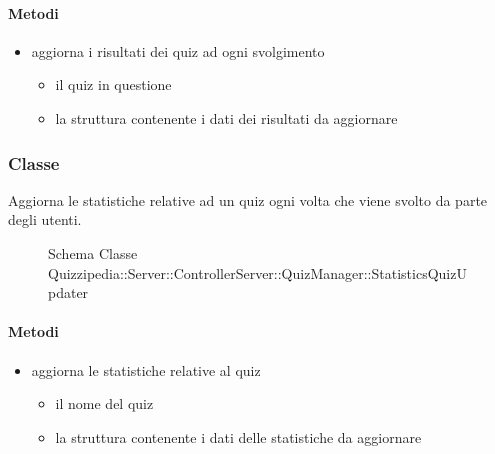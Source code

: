 \paragraph{Metodi}
\begin{itemize}
\item {}
\newline
aggiorna i risultati dei quiz ad ogni svolgimento
\newline
{}
\newline
\begin{itemize}
\item {}
\newline
il quiz in questione
\item {}
\newline
la struttura contenente i dati dei risultati da aggiornare
\end{itemize}
\end{itemize}
\subsubsection{Classe }
Aggiorna le statistiche relative ad un quiz ogni volta che viene svolto da parte degli utenti.
\begin{figure}[H]
\centering
\noindent{}
\caption[Schema Classe StatisticsQuizUpdater]{Schema Classe Quizzipedia::Server::ControllerServer::QuizManager::StatisticsQuizUpdater}
\end{figure}
\paragraph{Metodi}
\begin{itemize}
\item {}
\newline
aggiorna le statistiche relative al quiz
\newline
{}
\newline
\begin{itemize}
\item {}
\newline
il nome del quiz
\item {}
\newline
la struttura contenente i dati delle statistiche da aggiornare
\end{itemize}
\end{itemize}
